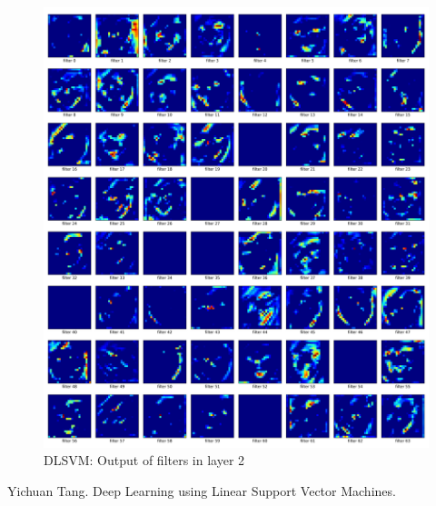 \documentclass[fleqn,a4paper,12pt]{article}
\begin{document}
\begin{figure}[h]
  \centering
  \includegraphics[width=\linewidth]{report-imgs/dlsvm-filter-output.png}
  \caption{DLSVM: Output of filters in layer 2}
  \label{fig:Output of filters in layer 2}
\end{figure}


\clearpage

\begin{thebibliography}{99}
Yichuan Tang. Deep Learning using Linear Support Vector Machines.  
\end{thebibliography}
\end{document}
